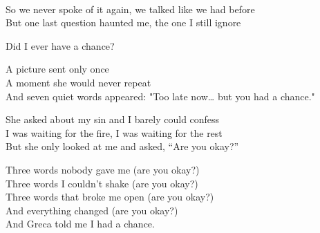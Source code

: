 \begin{lyrics}
\\
So we never spoke of it again, we talked like we had before\\
But one last question haunted me, the one I still ignore

Did I ever have a chance?

A picture sent only once\\
A moment she would never repeat\\
And seven quiet words appeared:
"Too late now… but you had a chance."

She asked about my sin and I barely could confess\\
I was waiting for the fire, I was waiting for the rest\\
But she only looked at me and asked, “Are you okay?”

Three words nobody gave me (are you okay?)\\
Three words I couldn't shake (are you okay?)\\
Three words that broke me open (are you okay?)\\
And everything changed (are you okay?)
\\
And Greca told me I had a chance.
\end{lyrics}